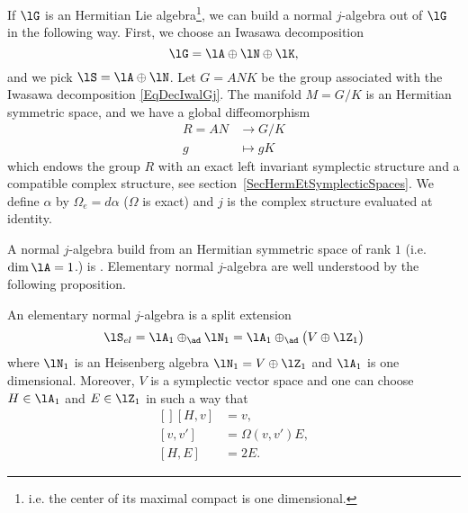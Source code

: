 If $\lG$ is an Hermitian Lie algebra\footnote{i.e. the center of its maximal compact is one dimensional.}, we can build a normal $j$-algebra out of $\lG$ in the following way. First, we choose an Iwasawa decomposition
\begin{equation}            \label{EqDecIwalGj}
	\lG=\lA\oplus\lN\oplus\lK,
\end{equation}
and we pick $\lS=\lA\oplus\lN$. Let $G=ANK$ be the group associated with the Iwasawa decomposition \eqref{EqDecIwalGj}. The manifold $M=G/K$ is an Hermitian symmetric space, and we have a global diffeomorphism
\begin{equation}
	\begin{aligned}
		R=AN & \to G/K    \\
		g    & \mapsto gK
	\end{aligned}
\end{equation}
which endows the group $R$ with an exact left invariant symplectic structure and a compatible complex structure, see section~\ref{SecHermEtSymplecticSpaces}. We define $\alpha$ by $\Omega_e=d\alpha$ ($\Omega$ is exact) and $j$ is the complex structure evaluated at identity.

A normal $j$-algebra build from an Hermitian symmetric space of rank $1$ (i.e. $\dim\lA=1$.) is . Elementary normal $j$-algebra are well understood by the following proposition.

\begin{proposition}     \label{PropStructNormalElementaireJalg}
	An elementary normal $j$-algebra is a split extension
	\begin{equation}        \label{EqDecoEleJal}
		\lS_{el}=\lA_{1}\oplus_{\ad}\lN_1=\lA_1\oplus_{\ad}\big( V\oplus\lZ_1 \big)
	\end{equation}
	where $\lN_1$ is an Heisenberg algebra $\lN_1=V\oplus\lZ_1$ and $\lA_1$ is one dimensional. Moreover, $V$ is a symplectic vector space and one can choose $H\in \lA_1$ and $E\in\lZ_1$ in such a way that
	\begin{equation}            \label{EqRelColNormaljAlg}
		\begin{aligned}[]
			[H,v]  & =v,             \\
			[v,v'] & =\Omega(v,v')E, \\
			[H,E]  & =2E.
		\end{aligned}
	\end{equation}
\end{proposition}

